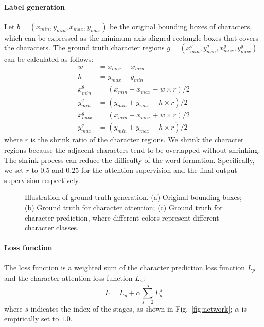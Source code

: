 \documentclass[letterpaper]{article} \usepackage{aaai19}  \usepackage{times}  \usepackage{helvet}  \usepackage{courier}  \usepackage{url}  \usepackage{graphicx}  \frenchspacing  \usepackage{multirow}
\begin{document}
\paragraph{Label generation}
Let $b=(x_{min}, y_{min}, x_{max}, y_{max})$ be the original bounding boxes of characters, which can be expressed as the minimum axis-aligned rectangle boxes that covers the characters. The ground truth character regions $g=(x_{min}^g,y_{min}^g,x_{max}^g,y_{max}^g)$ can be calculated as follows:
\begin{equation} \label{label_gen}
\begin{split}
w & = x_{max} - x_{min} \\
h & = y_{max} - y_{min} \\
x_{min}^g & = (x_{min} + x_{max} - w \times r ) / 2 \\
y_{min}^g & = (y_{min} + y_{max} - h \times r ) / 2 \\
x_{max}^g & = (x_{min} + x_{max} + w \times r ) / 2 \\
y_{max}^g & = (y_{min} + y_{max} + h \times r ) / 2 
\end{split}
\end{equation}
where $r$ is the shrink ratio of the character regions. We shrink the character regions because the adjacent characters tend to be overlapped without shrinking. The shrink process can reduce the difficulty of the word formation. Specifically, we set $r$ to $0.5$ and $0.25$ for the attention supervision and the final output supervision respectively.

\begin{figure}[!hbp]
\begin{center}
\captionsetup[subfigure]{justification=centering}
    \centering
{}
\end{center}
\caption{Illustration of ground truth generation. (a) Original bounding boxes; (b) Ground truth for character attention; (c) Ground truth for character prediction, where different colors represent different character classes.}
\label{fig:labels}
\end{figure}

\paragraph{Loss function}
The loss function is a weighted sum of the character prediction loss function $L_p$ and the character attention loss function $L_a$:
\begin{equation}
L = L_p + \alpha \sum_{s=2}^{5}L_a^s
\end{equation}
where $s$ indicates the index of the stages, as shown in Fig.~\ref{fig:network}; $\alpha$ is empirically set to $1.0$.
\end{document}
